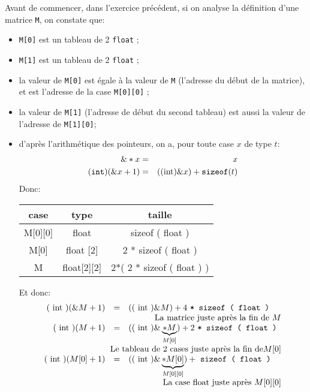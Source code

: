 Avant de commencer, dans l'exercice précédent, si on analyse la
définition d'une matrice \texttt{M}, on constate que:
\begin{itemize}
\item \texttt{M[0]} est un tableau de 2 \texttt{float} ;
\item \texttt{M[1]} est un tableau de 2 \texttt{float} ;
\item la valeur de \texttt{M[0]} est égale à la valeur de \texttt{M}
  (l'adresse du début de la matrice), et est l'adresse de la case
  \texttt{M[0][0]} ;
\item la valeur de \texttt{M[1]} (l'adresse de début du second
  tableau) est aussi la valeur de l'adresse de \texttt{M[1][0]};
\item d'après l'arithmétique des pointeurs, on a, pour toute case \(x\) de type \(t\):
  \begin{eqnarray}
    \& * x &=& x\\
    ( \text{\tt int} ) ( \& x + 1 ) &=& ( ( \text{int} ) \& x ) + \text{\tt sizeof} ( t )\\
  \end{eqnarray}
Donc:
\begin{center}
  \begin{tabular}{c|cc}
        case & type & taille \\
    \midrule
    M[0][0] & float & sizeof ( float ) \\
    M[0] & float [2] & 2 * sizeof ( float )\\
    M & float[2][2] & 2*( 2 * sizeof ( float ) ) \\
  \end{tabular}
\end{center}
Et donc:
\[
  \begin{array}{rcl}
( \text{ int } ) ( \& M + 1 ) & =&  ( ( \text{ int } ) \& M ) + 4 \text{ \tt * sizeof ( float ) } \\
    \multicolumn 3r{\text{La matrice juste après la fin de }M}\\
( \text{ int } ) ( M + 1 ) & =&  ( ( \text{ int } ) \& \underbrace{*M}_{M[0]} ) + 2 \text{ \tt * sizeof ( float ) } \\
    \multicolumn 3r{\text{Le tableau de 2 cases juste après la fin de} M[0]}\\
( \text{ int } ) ( M[0] + 1 ) & =&  ( ( \text{ int } ) \& \underbrace{*M[0]}_{M[0][0]} ) + \text{ \tt sizeof ( float ) } \\
    \multicolumn 3r {\text{La case float juste après }M[0][0]}\\
  \end{array}
\]
\end{itemize}
